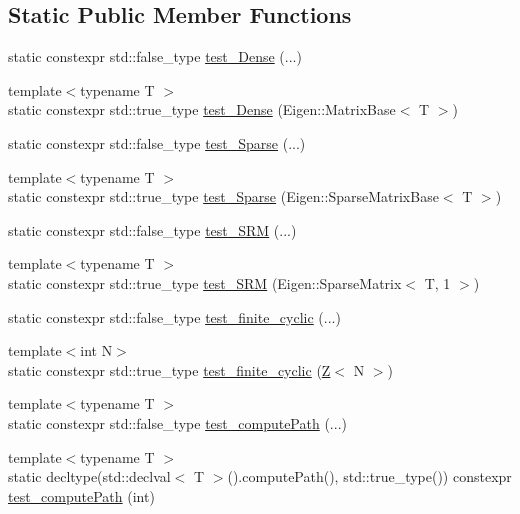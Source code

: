 \subsection*{Static Public Member Functions}
\begin{DoxyCompactItemize}
\item 
static constexpr std\+::false\+\_\+type \hyperlink{structMackey_1_1SFINAE_a1b75937bad3b6d9d0eaff8bd81a03b16}{test\+\_\+\+Dense} (...)
\item 
{\footnotesize template$<$typename T $>$ }\\static constexpr std\+::true\+\_\+type \hyperlink{structMackey_1_1SFINAE_a99bc0916be7136f9c496c4eb2b6393a2}{test\+\_\+\+Dense} (Eigen\+::\+Matrix\+Base$<$ T $>$)
\item 
static constexpr std\+::false\+\_\+type \hyperlink{structMackey_1_1SFINAE_a822455b3ae1980be0801f1ca334b5765}{test\+\_\+\+Sparse} (...)
\item 
{\footnotesize template$<$typename T $>$ }\\static constexpr std\+::true\+\_\+type \hyperlink{structMackey_1_1SFINAE_a933fbb1ee190a80299401705a474a677}{test\+\_\+\+Sparse} (Eigen\+::\+Sparse\+Matrix\+Base$<$ T $>$)
\item 
static constexpr std\+::false\+\_\+type \hyperlink{structMackey_1_1SFINAE_affbe05b9e94c425333fef47202fd19fc}{test\+\_\+\+S\+RM} (...)
\item 
{\footnotesize template$<$typename T $>$ }\\static constexpr std\+::true\+\_\+type \hyperlink{structMackey_1_1SFINAE_ad1aecc9a9a8af9287b17695cbfe1bffb}{test\+\_\+\+S\+RM} (Eigen\+::\+Sparse\+Matrix$<$ T, 1 $>$)
\item 
static constexpr std\+::false\+\_\+type \hyperlink{structMackey_1_1SFINAE_a2dd0f9b571ad5911cf90ae93a8e52d90}{test\+\_\+finite\+\_\+cyclic} (...)
\item 
{\footnotesize template$<$int N$>$ }\\static constexpr std\+::true\+\_\+type \hyperlink{structMackey_1_1SFINAE_abd3a99602470a3beaadb7a4e2418ac37}{test\+\_\+finite\+\_\+cyclic} (\hyperlink{classZ}{Z}$<$ N $>$)
\item 
{\footnotesize template$<$typename T $>$ }\\static constexpr std\+::false\+\_\+type \hyperlink{structMackey_1_1SFINAE_aa8d24c8b8818ab4d1613a127ad14f758}{test\+\_\+compute\+Path} (...)
\item 
{\footnotesize template$<$typename T $>$ }\\static decltype(std\+::declval$<$ T $>$().compute\+Path(), std\+::true\+\_\+type()) constexpr \hyperlink{structMackey_1_1SFINAE_acf66cc5b3fd626fc1c6d4fa80832c152}{test\+\_\+compute\+Path} (int)

\end{DoxyCompactItemize}
